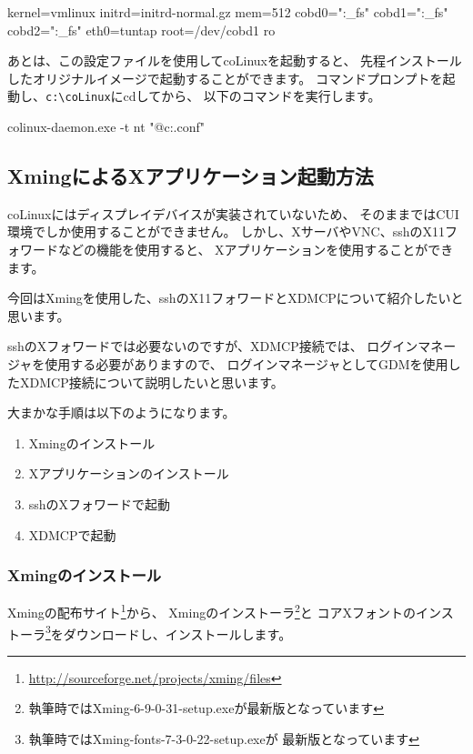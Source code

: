 \documentclass[mingoth,a4paper]{jsarticle}
\begin{document}
\begin{commandline}
kernel=vmlinux
initrd=initrd-normal.gz
mem=512
cobd0="\DosDevices\C:\software\coLinux\kdm\swap_fs"
cobd1="\DosDevices\C:\software\coLinux\kdm\root_fs"
cobd2="\DosDevices\C:\software\coLinux\kdm\home_fs"
eth0=tuntap
root=/dev/cobd1
ro
\end{commandline}

あとは、この設定ファイルを使用してcoLinuxを起動すると、
先程インストールしたオリジナルイメージで起動することができます。
コマンドプロンプトを起動し、\verb|c:\coLinux|にcdしてから、
以下のコマンドを実行します。

\begin{commandline}
colinux-daemon.exe -t nt "@c:\coLinux\debian.conf"
\end{commandline}



\subsection{XmingによるXアプリケーション起動方法}
coLinuxにはディスプレイデバイスが実装されていないため、
そのままではCUI環境でしか使用することができません。
しかし、XサーバやVNC、sshのX11フォワードなどの機能を使用すると、
Xアプリケーションを使用することができます。

今回はXmingを使用した、sshのX11フォワードとXDMCPについて紹介したいと思います。

sshのXフォワードでは必要ないのですが、XDMCP接続では、
ログインマネージャを使用する必要がありますので、
ログインマネージャとしてGDMを使用したXDMCP接続について説明したいと思います。

大まかな手順は以下のようになります。
\begin{enumerate}
\item Xmingのインストール
\item Xアプリケーションのインストール
\item sshのXフォワードで起動
\item XDMCPで起動
\end{enumerate}


\subsubsection{Xmingのインストール}
Xmingの配布サイト\footnote{\url{http://sourceforge.net/projects/xming/files}}から、
Xmingのインストーラ\footnote{執筆時ではXming-6-9-0-31-setup.exeが最新版となっています}と
コアXフォントのインストーラ\footnote{執筆時ではXming-fonts-7-3-0-22-setup.exeが
最新版となっています}をダウンロードし、インストールします。
\end{document}
